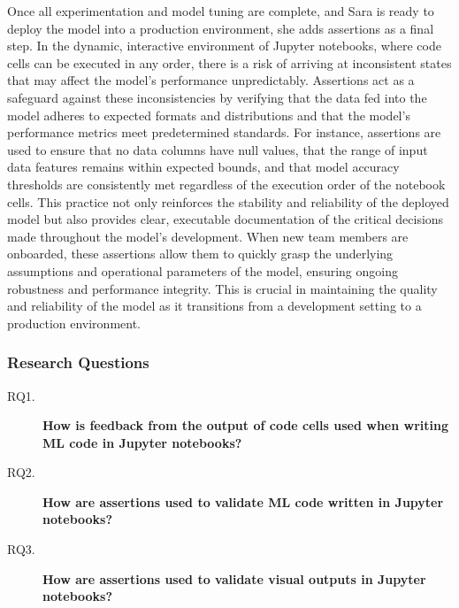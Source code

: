 Once all experimentation and model tuning are complete, and Sara is ready to deploy the model into a production environment, she adds assertions as a final step. In the dynamic, interactive environment of Jupyter notebooks, where code cells can be executed in any order, there is a risk of arriving at inconsistent states that may affect the model's performance unpredictably. Assertions act as a safeguard against these inconsistencies by verifying that the data fed into the model adheres to expected formats and distributions and that the model's performance metrics meet predetermined standards. For instance, assertions are used to ensure that no data columns have null values, that the range of input data features remains within expected bounds, and that model accuracy thresholds are consistently met regardless of the execution order of the notebook cells. This practice not only reinforces the stability and reliability of the deployed model but also provides clear, executable documentation of the critical decisions made throughout the model's development. When new team members are onboarded, these assertions allow them to quickly grasp the underlying assumptions and operational parameters of the model, ensuring ongoing robustness and performance integrity. This is crucial in maintaining the quality and reliability of the model as it transitions from a development setting to a production environment.

\subsubsection{Research Questions}

\begin{description}
  \item[RQ1.] \textbf{How is feedback from the output of code cells used when writing ML code in Jupyter notebooks?}
  \item[RQ2.] \textbf{How are assertions used to validate ML code written in Jupyter notebooks?}
  \item[RQ3.] \textbf{How are assertions used to validate visual outputs in Jupyter notebooks?}
\end{description}


